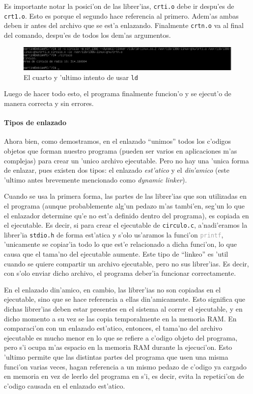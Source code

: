\documentclass[11pt]{article}
\newcommand{\subsubsubsection}[1]{\paragraph{#1}\mbox{}}
\begin{document}
		Es importante notar la posici'on de las librer'ias, \texttt{crti.o} debe ir despu'es de \texttt{crt1.o}. Esto es porque el segundo hace referencia al primero. Adem'as ambas deben ir antes del archivo que se est'a enlazando. Finalmente \texttt{crtn.o} va al final del comando, despu'es de todos los dem'as argumentos.
		
		\begin{figure}[H]
			\centering
			\includegraphics[width=.9\linewidth]{Images/Seccion 1/S1 parte nueve.PNG}
			\caption{El cuarto y 'ultimo intento de usar \texttt{ld}}
			\label{fig:fourth-ld-attempt}
		\end{figure}
		
		Luego de hacer todo esto, el programa finalmente funcion'o y se ejecut'o de manera correcta y sin errores. 


		\subsubsubsection{Tipos de enlazado}

		Ahora bien, como demostramos, en el enlazado ``unimos'' todos los c'odigos objetos que forman nuestro programa (pueden ser varios en aplicaciones m'as complejas) para crear un 'unico archivo ejecutable. Pero no hay una 'unica forma de enlazar, pues existen dos tipos: el enlazado \textit{est'atico} y el \textit{din'amico} (este 'ultimo antes brevemente mencionado como \textit{dynamic linker}).

		Cuando se usa la primera forma, las partes de las librer'ias que son utilizadas en el programa (aunque probablemente alg'un pedazo m'as tambi'en, seg'un lo que el enlazador determine qu'e no est'a definido dentro del programa), es copiada en el ejecutable. Es decir, si para crear el ejecutable de \texttt{circulo.c}, a'nadi'eramos la librer'ia \texttt{\textcolor{orange-desert-vim}{stdio.h}} de forma est'atica y s'olo us'aramos la funci'on \texttt{\textcolor{darkgray}{printf}}, 'unicamente se copiar'ia todo lo que est'e relacionado a dicha funci'on, lo que causa que el tama'no del ejecutable aumente. Este tipo de ``linkeo'' es 'util cuando se quiere compartir un archivo ejecutable, pero no sus librer'ias. Es decir, con s'olo enviar dicho archivo, el programa deber'ia funcionar correctamente.

		En el enlazado din'amico, en cambio, las librer'ias no son copiadas en el ejecutable, sino que se hace referencia a ellas din'amicamente. Esto significa que dichas librer'ias deben estar presentes en el sistema al correr el ejecutable, y en dicho momento a su vez se las copia temporalmente en la memoria RAM. En comparaci'on con un enlazado est'atico, entonces, el tama'no del archivo ejecutable es mucho menor en lo que se refiere a c'odigo objeto del programa, pero s'i ocupa m'as espacio en la memoria RAM durante la ejecuci'on. Esto 'ultimo permite que las distintas partes del programa que usen una misma funci'on varias veces, hagan referencia a un mismo pedazo de c'odigo ya cargado en memoria en vez de leerlo del programa en s'i, es decir, evita la repetici'on de c'odigo causada en el enlazado est'atico.
\end{document}
